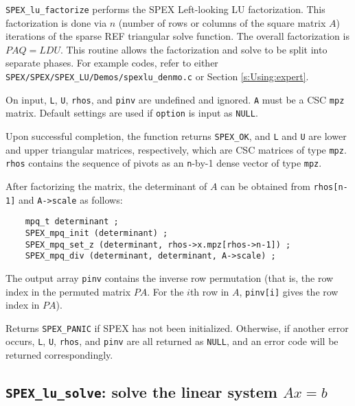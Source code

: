 \documentclass[12pt]{report}
\theoremstyle{definition}
\begin{document}
\verb|SPEX_lu_factorize| performs the SPEX Left-looking LU factorization.
This factorization is done via $n$ (number of rows or columns of the square
matrix $A$) iterations of the sparse REF triangular solve function. The overall
factorization is $PAQ = LDU$.  This routine allows the factorization and solve
to be split into separate phases.  For example codes, refer to either
\verb|SPEX/SPEX/SPEX_LU/Demos/spexlu_denmo.c| or Section \ref{s:Using:expert}.

On input, \verb|L|, \verb|U|, \verb|rhos|, and \verb|pinv| are undefined and
ignored.  \verb|A| must be a CSC \verb|mpz| matrix. Default settings are used
if \verb|option| is input as \verb|NULL|.

Upon successful completion, the function returns \verb|SPEX_OK|, and \verb|L|
and \verb|U| are lower and upper triangular matrices, respectively, which are
CSC matrices of type \verb|mpz|.  \verb|rhos| contains the sequence of pivots
as an \verb|n|-by-1 dense vector of type \verb|mpz|.

After factorizing the matrix, the determinant of $A$ can be obtained from
\verb|rhos[n-1]| and \verb|A->scale| as follows:

\begin{verbatim}
    mpq_t determinant ;
    SPEX_mpq_init (determinant) ;
    SPEX_mpq_set_z (determinant, rhos->x.mpz[rhos->n-1]) ;
    SPEX_mpq_div (determinant, determinant, A->scale) ;
\end{verbatim}

The output array \verb|pinv| contains the inverse row permutation (that is, the
row index in the permuted matrix $PA$. For the $i$th row in $A$, \verb|pinv[i]|
gives the row index in $PA$). 

Returns \verb|SPEX_PANIC| if SPEX has not been initialized.  Otherwise, if
another error occurs, \verb|L|, \verb|U|, \verb|rhos|, and \verb|pinv| are all
returned as \verb|NULL|, and an error code will be returned correspondingly.

\cprotect\subsection{\verb|SPEX_lu_solve|: solve the linear system $Ax=b$}
\label{ss:SPEX_lu_solve}
\end{document}
